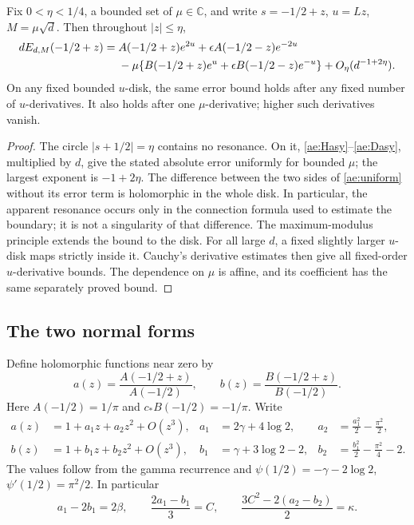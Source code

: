 \begin{lemma}
\label{ae:lemma-uniform}
Fix $0<\eta<1/4$, a bounded set of $\mu\in\mathbb C$, and write
$s=-1/2+z$, $u=Lz$, $M=\mu\sqrt d$. Then throughout $|z|\le\eta$,
\begin{align}
 dE_{d,M}(-1/2+z)={}& A(-1/2+z)e^{2u}
       +\epsilon A(-1/2-z)e^{-2u}\notag\\
 &-\mu\{B(-1/2+z)e^u
       +\epsilon B(-1/2-z)e^{-u}\}
       +O_\eta(d^{-1+2\eta}).\label{ae:uniform}
\end{align}
On any fixed bounded $u$-disk, the same error bound holds after any fixed
number of $u$-derivatives. It also holds after one $\mu$-derivative;
higher such derivatives vanish.
\end{lemma}

\begin{proof}
The circle $|s+1/2|=\eta$ contains no resonance. On it,
\eqref{ae:Hasy}--\eqref{ae:Dasy}, multiplied by $d$, give the stated
absolute error uniformly for bounded $\mu$; the largest exponent is
$-1+2\eta$. The difference between the two sides of \eqref{ae:uniform}
without its error term is holomorphic in the whole disk. In particular,
the apparent resonance occurs only in the connection formula used to
estimate the boundary; it is not a singularity of that difference.
The maximum-modulus principle extends the bound to the disk. For all
large $d$, a fixed slightly larger $u$-disk maps strictly inside it.
Cauchy's derivative estimates then give all fixed-order $u$-derivative
bounds. The dependence on $\mu$ is affine, and its coefficient has the
same separately proved bound.
\end{proof}

\subsection{The two normal forms}
Define holomorphic functions near zero by
\[
 a(z)=\frac{A(-1/2+z)}{A(-1/2)},\qquad
 b(z)=\frac{B(-1/2+z)}{B(-1/2)}.
\]
Here $A(-1/2)=1/\pi$ and $c_*B(-1/2)=-1/\pi$. Write
\begin{align*}
 a(z)&=1+a_1z+a_2z^2+O(z^3),&
 a_1&=2\gamma+4\log2,&a_2&=\frac{a_1^2}{2}-\frac{\pi^2}{2},\\
 b(z)&=1+b_1z+b_2z^2+O(z^3),&
 b_1&=\gamma+3\log2-2,&b_2&=\frac{b_1^2}{2}-\frac{\pi^2}{4}-2.
\end{align*}
The values follow from the gamma recurrence and
$\psi(1/2)=-\gamma-2\log2$, $\psi'(1/2)=\pi^2/2$.
In particular
\begin{equation}\label{ae:algebra}
 a_1-2b_1=2\beta,\qquad
 \frac{2a_1-b_1}{3}=C,\qquad
 \frac{3C^2-2(a_2-b_2)}2=\kappa.
\end{equation}

